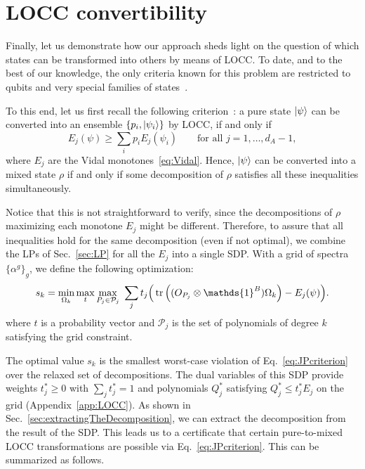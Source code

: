 \documentclass[aps,pra,twocolumn,superscriptaddress]{revtex4-2}
\newcommand{\one}{\mathds{1}}
\newcommand{\I}{\one}
\renewcommand{\a}{\alpha}
\begin{document}


\section{LOCC convertibility}
Finally, let us demonstrate how our approach sheds light on the question of which states can be transformed into others by means of LOCC. To date, and to the best of our knowledge, the only criteria known for this problem are restricted to qubits and very special families of states~\cite{Chitambar2014LOCC,Gour2005InfiniteConditions}.

To this end, let us first recall the following criterion~\cite{Jonathan_1999}: a pure state $\ket{\psi}$ can be converted into an ensemble $\{p_i, \ket{\psi_i}\}$ by LOCC, if and only if
\begin{equation}\label{eq:JPcriterion}
    E_j(\psi) \geq \sum_i p_i E_j(\psi_i)\qquad \text{for all } j=1,\dots,d_A-1,
\end{equation}
where $E_j$ are the Vidal monotones~\eqref{eq:Vidal}.
Hence, $\ket{\psi}$ can be converted into a mixed state $\rho$ if and only if some decomposition of $\rho$ satisfies all these inequalities simultaneously.

Notice that this is not straightforward to verify, since the decompositions of $\rho$ maximizing each monotone $E_j$ might be different. Therefore, to assure that all inequalities hold for the same decomposition (even if not optimal), we combine the LPs of Sec.~\ref{sec:LP} for all the $E_j$ into a single SDP. With a grid of spectra $\{\a^g\}_g$, we define the following optimization:
\begin{align}\label{eq:LOCCminmaxt}
    s_k=\min_{\Omega_k} \max_t \max_{P_j\in\mathcal{P}_j}\ \sum_j t_j\Big(\tr\left((O_{P_j}\otimes\I^B)\Omega_k\right)-E_j(\psi)\Big).
\end{align}
where $t$ is a probability vector and $\mathcal{P}_j$ is the set of polynomials of degree $k$ satisfying the grid constraint.

The optimal value $s_k$ is the smallest worst-case violation of Eq.~\eqref{eq:JPcriterion} over the relaxed set of decompositions. The dual variables of this SDP provide weights $t_j^*\geq0$ with $\sum_jt^*_j=1$ and polynomials $Q_j^*$ satisfying $Q^*_j\leq t^*_jE_j$ on the grid (Appendix~\ref{app:LOCC}).
As shown in Sec.~\ref{sec:extractingTheDecomposition}, we can extract the decomposition from the result of the SDP. This leads us to a certificate that certain pure-to-mixed LOCC transformations are possible via Eq.~\eqref{eq:JPcriterion}. This can be summarized as follows.
\end{document}
